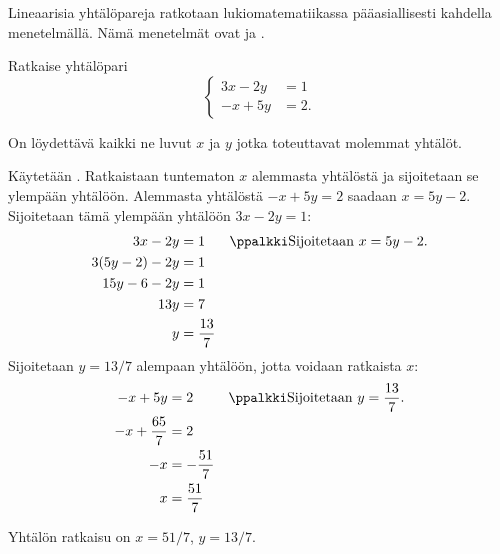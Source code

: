 Lineaarisia yhtälöpareja ratkotaan lukiomatematiikassa pääasiallisesti kahdella menetelmällä.
Nämä menetelmät ovat  ja
.
\begin{esimerkki}
Ratkaise yhtälöpari
\[
\left\{
\begin{aligned}
3x-2y&= 1 \\
-x+5y&= 2.
\end{aligned}
\right.
\]
\begin{esimratk}
On löydettävä kaikki ne luvut $x$ ja $y$ jotka toteuttavat molemmat yhtälöt.

Käytetään . Ratkaistaan tuntematon $x$ alemmasta yhtälöstä ja sijoitetaan se ylempään yhtälöön. Alemmasta yhtälöstä $-x+5y= 2$ saadaan $x=5y-2$. Sijoitetaan tämä ylempään yhtälöön $3x-2y=1$:
\begin{align*}
3x-2y&=1 && \ppalkki \text{Sijoitetaan $x=5y-2$.} \\
3(5y-2)-2y&=1 && \\
15y-6-2y&=1 && \\
13y&=7 && \\
y&=\frac{13}{7} && \\
\end{align*}
Sijoitetaan $y=13/7$ alempaan yhtälöön, jotta voidaan ratkaista $x$:
\begin{align*}
-x+5y&= 2 && \ppalkki \text{Sijoitetaan $y=\frac{13}{7}$.} \\
-x+\frac{65}{7}&= 2 && \\
-x&= -\frac{51}{7}&& \\
x&= \frac{51}{7}&&
\end{align*}
\end{esimratk}
\begin{esimvast}
Yhtälön ratkaisu on $x= 51/7$, $y=13/7$.
\end{esimvast}
\end{esimerkki}

